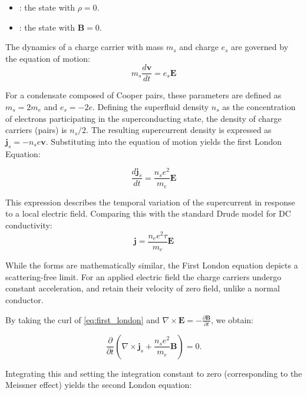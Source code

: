 \begin{itemize}
    \item {}: the state with $\rho = 0$.
    \item {}: the state with $\mathbf{B} = 0$.
\end{itemize}

The dynamics of a charge carrier with mass $m_s$ and charge $e_s$ are governed by the equation of motion:
\begin{equation}
    m_s \frac{d\mathbf{v}}{dt} = e_s \mathbf{E}
\end{equation}

For a condensate composed of Cooper pairs, these parameters are defined as $m_s = 2m_e$ and $e_s = -2e$. Defining the superfluid density $n_s$ as the concentration of electrons participating in the superconducting state, the density of charge carriers (pairs) is $n_s/2$. The resulting supercurrent density is expressed as $\mathbf{j}_s = -n_s e \mathbf{v}$. Substituting into the equation of motion yields the first London Equation:

\begin{equation}\label{eq:first_london}
    \frac{d\mathbf{j}_s}{dt} = \frac{n_s e^2}{m_e} \mathbf{E}
\end{equation}

This expression describes the temporal variation of the supercurrent in response to a local electric field. Comparing this with the standard Drude model for DC conductivity:
\begin{equation}
    \mathbf{j} = \frac{n_e e^2 \tau}{m_e} \mathbf{E}
\end{equation}

While the forms are mathematically similar, the First London equation depicts a scattering-free limit. For an applied electric field the charge carriers undergo constant acceleration, and retain their velocity of zero field, unlike a normal conductor.

By taking the curl of \cref{eq:first_london} and $\nabla \times \mathbf{E} = -\frac{\partial \mathbf{B}}{\partial t}$, we obtain:

\begin{equation}
    \frac{\partial}{\partial t} \left( \nabla \times \mathbf{j}_s + \frac{n_s e^2}{m_e} \mathbf{B} \right) = 0.
\end{equation}

Integrating this and setting the integration constant to zero (corresponding to the Meissner effect) yields the second London equation:


